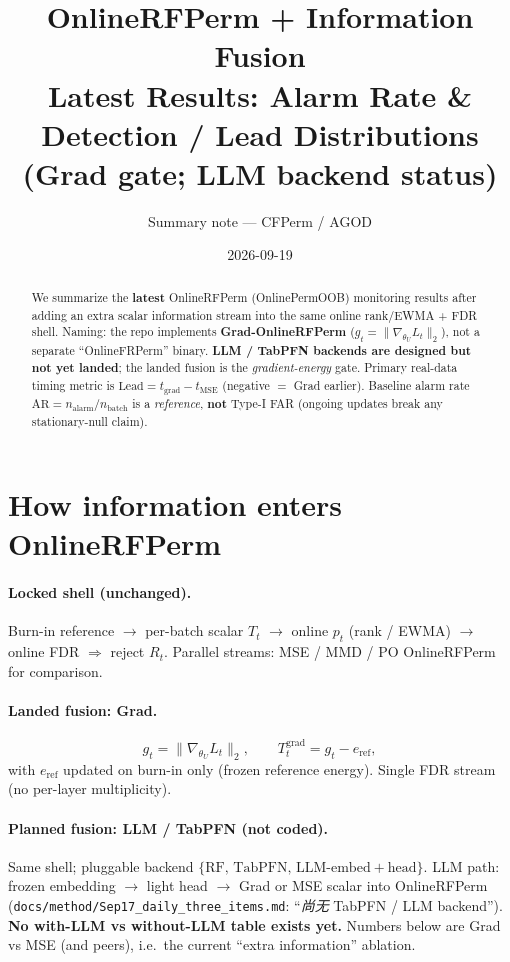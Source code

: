 \documentclass[11pt]{article}
\title{\textbf{OnlineRFPerm + Information Fusion}\\
\large Latest Results: Alarm Rate \& Detection / Lead Distributions\\
\large (Grad gate; LLM backend status)}
\author{Summary note --- CFPerm / AGOD}
\date{2026-09-19}
\newcommand{\Lead}{\mathrm{Lead}}
\newcommand{\AR}{\mathrm{AR}}
\newcommand{\gradU}{\nabla_{\theta_U}}
\begin{document}
\maketitle

\begin{abstract}
We summarize the \textbf{latest} OnlineRFPerm (OnlinePermOOB) monitoring
results after adding an extra scalar information stream into the same
online rank/EWMA + FDR shell.
Naming: the repo implements \textbf{Grad-OnlineRFPerm}
($g_t=\|\gradU L_t\|_2$), not a separate ``OnlineFRPerm'' binary.
\textbf{LLM / TabPFN backends are designed but not yet landed}; the
landed fusion is the \emph{gradient-energy} gate.
Primary real-data timing metric is
$\Lead=t_{\mathrm{grad}}-t_{\mathrm{MSE}}$ (negative $=$ Grad earlier).
Baseline alarm rate $\AR=n_{\mathrm{alarm}}/n_{\mathrm{batch}}$ is a
\emph{reference}, \textbf{not} Type-I FAR (ongoing updates break any
stationary-null claim).
\end{abstract}

\section{How information enters OnlineRFPerm}
\label{sec:fuse}

\paragraph{Locked shell (unchanged).}
Burn-in reference $\to$ per-batch scalar $T_t$ $\to$ online $p_t$
(rank / EWMA) $\to$ online FDR $\Rightarrow$ reject $R_t$.
Parallel streams: MSE / MMD / PO OnlineRFPerm for comparison.

\paragraph{Landed fusion: Grad.}
\[
  g_t=\|\gradU L_t\|_2,\qquad
  T_t^{\mathrm{grad}}=g_t-e_{\mathrm{ref}},
\]
with $e_{\mathrm{ref}}$ updated on burn-in only (frozen reference
energy). Single FDR stream (no per-layer multiplicity).

\paragraph{Planned fusion: LLM / TabPFN (not coded).}
Same shell; pluggable backend
$\{\mathrm{RF},\,\mathrm{TabPFN},\,\mathrm{LLM\text{-}embed+head}\}$.
LLM path: frozen embedding $\to$ light head $\to$ Grad or MSE scalar
into OnlineRFPerm
(\texttt{docs/method/Sep17\_daily\_three\_items.md}:
``\emph{尚无} TabPFN / LLM backend'').
\textbf{No with-LLM vs without-LLM table exists yet.}
Numbers below are Grad vs MSE (and peers), i.e.\ the current
``extra information'' ablation.
\end{document}
